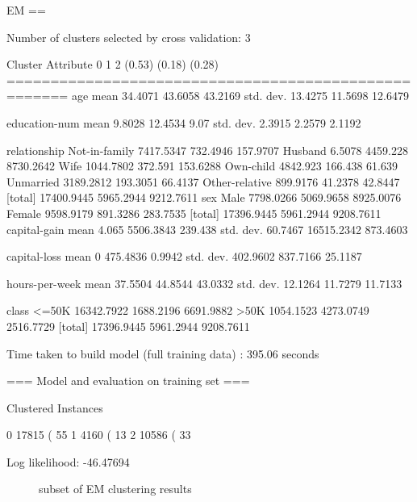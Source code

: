 \documentclass{sig-alternate}
\begin{document}
\scriptsize
\begin{verbbox}
EM
==

Number of clusters selected by cross validation: 3


                     Cluster
Attribute                  0           1           2
                      (0.53)      (0.18)      (0.28)
=====================================================
age
  mean                34.4071     43.6058     43.2169
  std. dev.           13.4275     11.5698     12.6479

education-num
  mean                 9.8028     12.4534        9.07
  std. dev.            2.3915      2.2579      2.1192

relationship
   Not-in-family    7417.5347    732.4946    157.9707
   Husband             6.5078    4459.228   8730.2642
   Wife             1044.7802     372.591    153.6288
   Own-child         4842.923     166.438      61.639
   Unmarried        3189.2812    193.3051     66.4137
   Other-relative    899.9176     41.2378     42.8447
  [total]          17400.9445   5965.2944   9212.7611
sex
   Male             7798.0266   5069.9658   8925.0076
   Female           9598.9179    891.3286    283.7535
  [total]          17396.9445   5961.2944   9208.7611
capital-gain
  mean                  4.065   5506.3843     239.438
  std. dev.           60.7467  16515.2342    873.4603

capital-loss
  mean                      0    475.4836      0.9942
  std. dev.          402.9602    837.7166     25.1187

hours-per-week
  mean                37.5504     44.8544     43.0332
  std. dev.           12.1264     11.7279     11.7133

class
   <=50K           16342.7922   1688.2196   6691.9882
   >50K             1054.1523   4273.0749   2516.7729
  [total]          17396.9445   5961.2944   9208.7611


Time taken to build model (full training data) : 395.06 seconds

=== Model and evaluation on training set ===

Clustered Instances

0      17815 ( 55%
1       4160 ( 13%
2      10586 ( 33%

Log likelihood: -46.47694
\end{verbbox}
\normalsize

\begin{figure}[!htbp]
    \centering
    \theverbbox
    \caption{subset of EM clustering results\label{em-summary}}
\end{figure}
\end{document}
